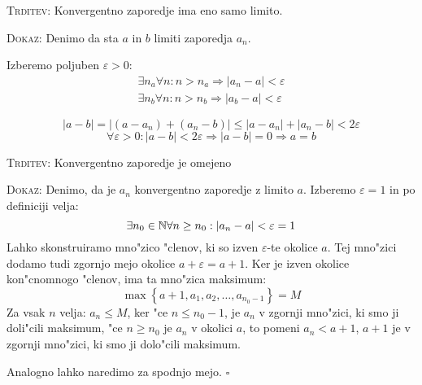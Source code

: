 \textsc{Trditev:} Konvergentno zaporedje ima eno samo limito.

\textsc{Dokaz:} Denimo da sta $a$ in $b$ limiti zaporedja $a_n$.
\begin{multicols}{2}
Izberemo poljuben $\varepsilon > 0:$
\columnbreak
\begin{gather*}
	\exists n_a \forall n: n > n_a \Rightarrow |a_n - a| < \varepsilon \\
	\exists n_b \forall n: n > n_b \Rightarrow |a_b - a| < \varepsilon
\end{gather*}
\end{multicols}
\begin{equation*}
|a - b| = |(a-a_n) + (a_n-b)| \leq |a-a_n| + |a_n-b| < 2\varepsilon
\end{equation*}
\begin{equation*}
\forall \varepsilon > 0: |a-b| < 2\varepsilon \Rightarrow |a-b| = 0 \Rightarrow a = b
\end{equation*}

\textsc{Trditev:} Konvergentno zaporedje je omejeno

\textsc{Dokaz:} Denimo, da je $a_n$ konvergentno zaporedje z limito $a$. Izberemo $\varepsilon = 1$ in po definiciji velja:
\begin{equation*}
\exists n_0 \in \mathbb{N} \forall n \geq n_0: |a_n - a| < \varepsilon = 1
\end{equation*}
Lahko skonstruiramo mno"zico "clenov, ki so izven $\varepsilon$-te okolice $a$. Tej mno"zici dodamo tudi zgornjo mejo okolice $a + \varepsilon = a + 1$. Ker je izven okolice kon"cnomnogo "clenov, ima ta mno"zica maksimum:
\begin{equation*}
\max \left\{a+1, a_1, a_2, \ldots, a_{n_0-1} \right\} = M
\end{equation*}
Za vsak $n$ velja: $a_n \leq M$, ker "ce $n \leq n_0 - 1$, je $a_n$ v zgornji mno"zici, ki smo ji doli"cili maksimum, "ce $n \geq n_0$ je $a_n$ v okolici $a$, to pomeni $a_n < a + 1$, $a+1$ je v zgornji mno"zici, ki smo ji dolo"cili maksimum.

Analogno lahko naredimo za spodnjo mejo. \hfill $\square$
